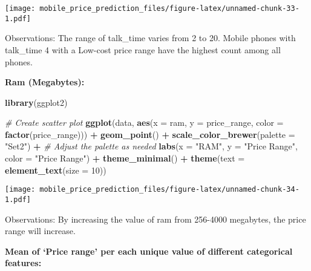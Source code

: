 \documentclass[
]{article}
\newenvironment{Shaded}{\begin{snugshade}}{\end{snugshade}}
\newcommand{\AttributeTok}[1]{\textcolor[rgb]{0.13,0.29,0.53}{#1}}
\newcommand{\CommentTok}[1]{\textcolor[rgb]{0.56,0.35,0.01}{\textit{#1}}}
\newcommand{\DecValTok}[1]{\textcolor[rgb]{0.00,0.00,0.81}{#1}}
\newcommand{\FunctionTok}[1]{\textcolor[rgb]{0.13,0.29,0.53}{\textbf{#1}}}
\newcommand{\NormalTok}[1]{#1}
\newcommand{\SpecialCharTok}[1]{\textcolor[rgb]{0.81,0.36,0.00}{\textbf{#1}}}
\newcommand{\StringTok}[1]{\textcolor[rgb]{0.31,0.60,0.02}{#1}}
\begin{document}
\texttt{[image: mobile\_price\_prediction\_files/figure-latex/unnamed-chunk-33-1.pdf]}

Observations: The range of talk\_time varies from 2 to 20. Mobile phones
with talk\_time 4 with a Low-cost price range have the highest count
among all phones.

\textbf{Ram (Megabytes):}

\begin{Shaded}
\begin{Highlighting}[]
\FunctionTok{library}\NormalTok{(ggplot2)}

\CommentTok{\# Create scatter plot}
\FunctionTok{ggplot}\NormalTok{(data, }\FunctionTok{aes}\NormalTok{(}\AttributeTok{x =}\NormalTok{ ram, }\AttributeTok{y =}\NormalTok{ price\_range, }\AttributeTok{color =} \FunctionTok{factor}\NormalTok{(price\_range))) }\SpecialCharTok{+}
  \FunctionTok{geom\_point}\NormalTok{() }\SpecialCharTok{+}
  \FunctionTok{scale\_color\_brewer}\NormalTok{(}\AttributeTok{palette =} \StringTok{"Set2"}\NormalTok{) }\SpecialCharTok{+}  \CommentTok{\# Adjust the palette as needed}
  \FunctionTok{labs}\NormalTok{(}\AttributeTok{x =} \StringTok{"RAM"}\NormalTok{, }\AttributeTok{y =} \StringTok{"Price Range"}\NormalTok{, }\AttributeTok{color =} \StringTok{"Price Range"}\NormalTok{) }\SpecialCharTok{+}
  \FunctionTok{theme\_minimal}\NormalTok{() }\SpecialCharTok{+}
  \FunctionTok{theme}\NormalTok{(}\AttributeTok{text =} \FunctionTok{element\_text}\NormalTok{(}\AttributeTok{size =} \DecValTok{10}\NormalTok{))}
\end{Highlighting}
\end{Shaded}

\texttt{[image: mobile\_price\_prediction\_files/figure-latex/unnamed-chunk-34-1.pdf]}

Observations: By increasing the value of ram from 256-4000 megabytes,
the price range will increase.

\textbf{Mean of `Price range' per each unique value of different
categorical features:}
\end{document}
